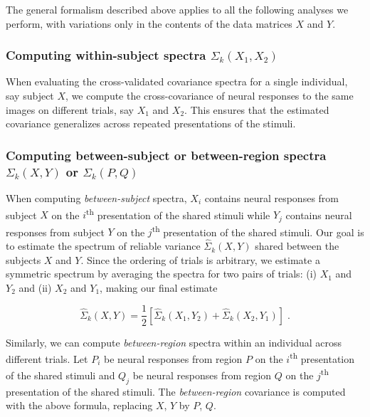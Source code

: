 \documentclass[10pt]{article}
\begin{document}
The general formalism described above applies to all the following analyses we perform, with variations only in the contents of the data matrices \(X\) and \(Y\).

\subsubsection{\texorpdfstring{Computing within-subject spectra \(\Sigma_k(X_1, X_2)\)}{Computing within-subject spectra \textbackslash Sigma\_k(X\_1, X\_2)}}\label{computing-within-subject-spectra-sigma_kx_1-x_2}

When evaluating the cross-validated covariance spectra for a single individual, say subject \(X\), we compute the cross-covariance of neural responses to the same images on different trials, say \(X_1\) and \(X_2\). This ensures that the estimated covariance generalizes across repeated presentations of the stimuli.

\subsubsection{\texorpdfstring{Computing between-subject or between-region spectra \(\Sigma_k(X, Y)\) or \(\Sigma_k(P, Q)\)}{Computing between-subject or between-region spectra \textbackslash Sigma\_k(X, Y) or \textbackslash Sigma\_k(P, Q)}}\label{computing-between-subject-or-between-region-spectra-sigma_kx-y-or-sigma_kp-q}

When computing \emph{between-subject} spectra, \(X_i\) contains neural responses from subject \(X\) on the \(i\)\textsuperscript{th} presentation of the shared stimuli while \(Y_j\) contains neural responses from subject \(Y\) on the \(j\)\textsuperscript{th} presentation of the shared stimuli. Our goal is to estimate the spectrum of reliable variance \(\hat{\Sigma}_k(X, Y)\) shared between the subjects \(X\) and \(Y\). Since the ordering of trials is arbitrary, we estimate a symmetric spectrum by averaging the spectra for two pairs of trials: (i) \(X_1\) and \(Y_2\) and (ii) \(X_2\) and \(Y_1\), making our final estimate

\[
\hat{\Sigma}_k(X, Y) = \frac{1}{2}\left[\hat{\Sigma}_k(X_1, Y_2) + \hat{\Sigma}_k(X_2, Y_1)\right]\;.
\]

Similarly, we can compute \emph{between-region} spectra within an individual across different trials. Let \(P_i\) be neural responses from region \(P\) on the \(i\)\textsuperscript{th} presentation of the shared stimuli and \(Q_j\) be neural responses from region \(Q\) on the \(j\)\textsuperscript{th} presentation of the shared stimuli. The \emph{between-region} covariance is computed with the above formula, replacing \(X\), \(Y\) by \(P\), \(Q\).
\end{document}

